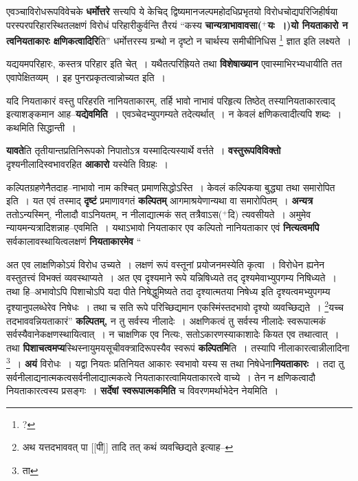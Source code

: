 \documentclass[article,12pt,a4paper]{memoir}
\newcommand{\add}[1]{($^{+}$#1)}
\begin{document}
	  \pstart एवञ्चाविरोधरूपविवेचके \textbf{धर्मोत्तरे} सत्त्यपि ये केचिद् द्विष्यमानजल्पमहोदधिप्रभृतयो विरोधचोद्यपरिजिहीर्षया परस्परपरिहारस्थितलक्षणं विरोधं परिहारीकुर्वन्ति तैरयं “कस्य \textbf{चान्यत्राभावावसा\add{यः ।}यो नियताकारो न त्वनियताकारः क्षणिकत्वादिरि}ति” धर्मोत्तरस्य ग्रन्थो न दृष्टो न चार्थस्य समीचीनिधिस \footnote{?} ज्ञात इति लक्ष्यते ।
	\pend
      

	  \pstart यद्ययमपरिहारः, कस्तत्र परिहार इति चेत् । यथैतत्परिह्रियते तथा \textbf{विशेषाख्यान} एवास्माभिरभ्यधायीति तत एवापेक्षितव्यम् । इह पुनरप्रकृतत्वान्नोच्यत इति ।
	\pend
      

	  \pstart यदि नियताकारं वस्तु परिहरति नानियताकारम्, तर्हि भावो नाभावं परिहृत्य तिष्ठेत् तस्यानियताकारत्वाद् इत्याशङ्कमान आह--\textbf{यद्येवमिति} । एवञ्चेदभ्युपगम्यते तदेत्यर्थात् । न केवलं क्षणिकत्वादीत्यपि शब्दः । कथमिति सिद्धान्ती ।
	\pend
      

	  \pstart \textbf{यावते}ति तृतीयान्तप्रतिनिरूपको निपातोऽत्र यस्मादित्यस्यार्थे वर्त्तते । \textbf{वस्तुरूपविविक्तो} दृश्यनीलादिस्वभावरहित \textbf{आकारो} यस्येति विग्रहः ।
	\pend
      

	  \pstart कल्पितग्रहणेनैतदाह--नाभावो नाम कश्चित् प्रमाणसिद्धोऽस्ति । केवलं कल्पिकया बुद्ध्या तथा समारोपित इति । यत एवं तस्माद् \textbf{दृष्टं} प्रमाणावगतं \textbf{कल्पितम्} आगमाश्रयेणान्यथा वा समारोपितम् । \textbf{अन्यत्र} ततोऽन्यस्मिन्, नीलादौ वाऽनियतम्, न नीलाद्यात्मकं सत् तत्रैवाऽस\add{दि} त्यवसीयते । अमुमेव न्यायमन्यत्रादिशन्ना\leavevmode{}ह--एवमिति । यथाऽभावो नियताकार एव कल्पितो नानियताकार एवं \textbf{नित्यत्वमपि} सर्वकालावस्थायित्वलक्षणं \textbf{नियताकारमेव}  \leavevmode{} “
	  
	अत एव लाक्षणिकोऽयं विरोध उच्यते । लक्षणं रूपं वस्तूनां प्रयोजनमस्येति कृत्वा । विरोधेन ह्यनेन वस्तुतत्त्वं विभक्तं व्यवस्थाप्यते । अत एव दृश्यमाने रूपे यन्निषिध्यते तद् दृश्यमेवाभ्युपगम्य निषिध्यते । तथा हि--अभावोऽपि पिशाचोऽपि यदा पीते निषेद्धुमिष्यते तदा दृश्यात्मतया निषेध्य इति दृश्यत्वमभ्युपगम्य दृश्यानुपलब्धेरेव निषेधः । तथा च सति रूपे परिच्छिद्यमान एकस्मिंस्तदभावो दृश्यो व्यवच्छिद्यते । \footnote{अथ यत्तदभाववत् पा [[पी]] तादि तत् कथं व्यवच्छिद्यते इत्याह--\cite{dp-msD-n}}यच्च तदभाववन्नियताकारं” \textbf{कल्पितम्,} न तु सर्वस्य नीलादेः । अक्षणिकत्वं तु सर्वस्य नीलादेः स्वरूपात्मकं सर्वस्यैवानेकक्षणस्थायित्वात् । न चाक्षणिक एव नित्यः, सतोऽकारणस्याकाशादेः कियत एव तथात्वात् । तथा \textbf{पिशाचत्वमप्य}स्थिस्नायुमयसूचीवक्त्रादिरूपस्यैव स्वरूपं \textbf{कल्पितमि}ति । तस्यापि नीलाकारत्वान्नीलादिना \footnote{ता} । \textbf{अयं} विरोधः । यद्वा नियतः प्रतिनियत आकारः स्वभावो यस्य स तथा निषेधेना\textbf{नियताकारः} । तदा तु सर्वनीलाद्यनात्मकत्वसर्वनीलाद्यात्मकत्वे नियताकारत्वामियताकारत्वे वाच्ये । तेन न क्षणिकत्वादौ नियताकारत्वस्य प्रसङ्गः । \textbf{सर्देषां स्वरूपात्मकमिति} च विवरणमर्थाभेदेन नेयमिति ।
	\pend
      
\end{document}
